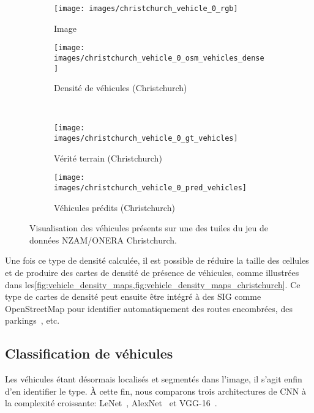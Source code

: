 \begin{figure}[h]
  \centering
  \begin{subfigure}{0.35\textwidth}
    \texttt{[image: images/christchurch\_vehicle\_0\_rgb]}
    \caption{Image }
  \end{subfigure}
  \hspace{0.1\textwidth}
  \begin{subfigure}{0.35\textwidth}
    \texttt{[image: images/christchurch\_vehicle\_0\_osm\_vehicles\_dense]}
    \caption{Densité de véhicules (Christchurch)}
  \end{subfigure}\\
  \begin{subfigure}{0.35\textwidth}
    \texttt{[image: images/christchurch\_vehicle\_0\_gt\_vehicles]}
    \caption{Vérité terrain (Christchurch)}
  \end{subfigure}
  \hspace{0.1\textwidth}
  \begin{subfigure}{0.35\textwidth}
    \texttt{[image: images/christchurch\_vehicle\_0\_pred\_vehicles]}
    \caption{Véhicules prédits (Christchurch)}
  \end{subfigure}
  \caption{Visualisation des véhicules présents sur une des tuiles du jeu de données NZAM/ONERA Christchurch.}
  \label{fig:vehicle_density_maps_christchurch}
\end{figure}

Une fois ce type de densité calculée, il est possible de réduire la taille des cellules et de produire des cartes de densité de présence de véhicules, comme illustrées dans les\cref{fig:vehicle_density_maps,fig:vehicle_density_maps_christchurch}. Ce type de cartes de densité peut ensuite être intégré à des \gls{SIG} comme OpenStreetMap pour identifier automatiquement des routes encombrées, des parkings~\cite{kamenetsky_aerial_2015}, etc.

\subsection{Classification de véhicules}

Les véhicules étant désormais localisés et segmentés dans l'image, il s'agit enfin d'en identifier le type. À cette fin, nous comparons trois architectures de \gls{CNN} à la complexité croissante: LeNet~\cite{lecun_gradient-based_1998}, AlexNet~\cite{krizhevsky_imagenet_2012} et VGG-16~\cite{simonyan_very_2015}.

